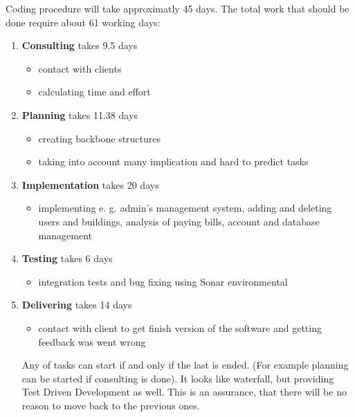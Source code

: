 \documentclass[a4paper,11pt,onecolumn,oneside]{book}
\begin{document}
Coding procedure will take approximatly 45 days.  The total work that should be done require about 61 working days:
\begin{enumerate}
  \item \textbf{Consulting} takes 9.5 days
  
  \begin{itemize}
  \item contact with clients
  \item calculating time and effort
  \end{itemize}

  \item \textbf{Planning} takes 11.38 days 
  
  \begin{itemize}
  \item creating backbone structures
  \item taking into account many implication and hard to predict tasks
  \end{itemize}
  
  \item \textbf{Implementation} takes 20 days 
 
  \begin{itemize}
  \item implementing e. g. admin’s management system, adding and deleting users and buildings,
	analysis of paying bills, account and database management

  \end{itemize}

  \item \textbf{Testing}  takes 6 days 
  
  \begin{itemize}
  \item integration tests and bug fixing using Sonar environmental
  \end{itemize}
  
  \item \textbf{Delivering} takes 14 days
  
  \begin{itemize}
  \item contact with client to get finish version of the software and getting feedback was went wrong
  \end{itemize}
  
  Any of tasks can start if and only if the last is ended. (For example planning can be started if consulting is done). It looks like waterfall, but providing Test Driven Development as well. This is an assurance, that there will be no reason to move back to the previous ones. 
  
\end{enumerate}
\end{document}
